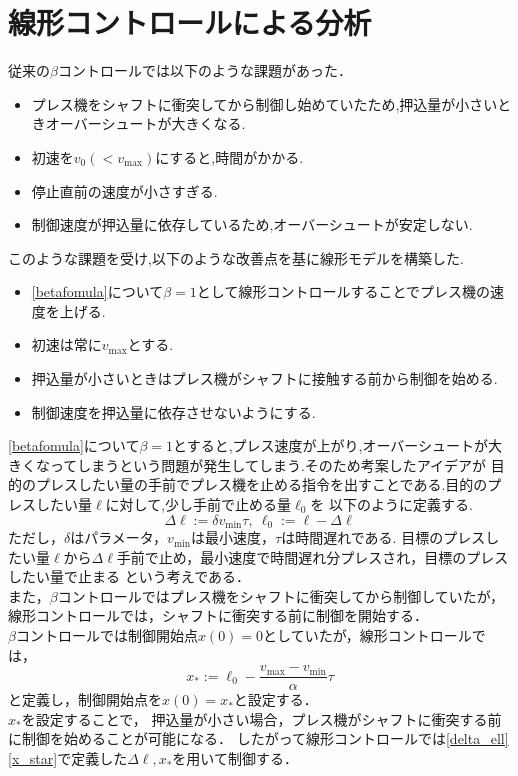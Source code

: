 \documentclass [dvipdfmx] {jsarticle}
\numberwithin{equation}{section}
\theoremstyle{definition} %
\theoremstyle{definition} %
\begin{document}
\section{線形コントロールによる分析}
従来の$\beta$コントロールでは以下のような課題があった．
\begin{itemize}
    \item プレス機をシャフトに衝突してから制御し始めていたため,押込量が小さいときオーバーシュートが大きくなる.
    \item 初速を$v_0(<v_{\max})$にすると,時間がかかる.
    \item 停止直前の速度が小さすぎる.
    \item 制御速度が押込量に依存しているため,オーバーシュートが安定しない.
\end{itemize}
このような課題を受け,以下のような改善点を基に線形モデルを構築した.
\begin{itemize}
    \item \eqref{betafomula}について$\beta=1$として線形コントロールすることでプレス機の速度を上げる. 
    \item 初速は常に$v_{\max}$とする.
    \item 押込量が小さいときはプレス機がシャフトに接触する前から制御を始める.
    \item 制御速度を押込量に依存させないようにする.
\end{itemize}
\eqref{betafomula}について$\beta=1$とすると,プレス速度が上がり,オーバーシュートが大きくなってしまうという問題が発生してしまう.そのため考案したアイデアが
目的のプレスしたい量の手前でプレス機を止める指令を出すことである.目的のプレスしたい量$\ell$に対して,少し手前で止める量$\ell_0$を
以下のように定義する.
\begin{equation}\label{delta_ell}
    \Delta\ell :=\delta v_{\min}\tau,\ \ell_0:=\ell-\Delta\ell
\end{equation}
ただし，$\delta$はパラメータ，$v_{\min}$は最小速度，$\tau$は時間遅れである.
目標のプレスしたい量$\ell$から$\Delta\ell$手前で止め，最小速度で時間遅れ分プレスされ，目標のプレスしたい量で止まる
という考えである．\\
また，$\beta$コントロールではプレス機をシャフトに衝突してから制御していたが，線形コントロールでは，シャフトに衝突する前に制御を開始する．\\
$\beta$コントロールでは制御開始点$x(0)=0$としていたが，線形コントロールでは，
\begin{equation}\label{x_star}
    x_\ast:=\ell_0-\displaystyle\frac{v_{\max}-v_{\min}}{\alpha}\tau
\end{equation}
と定義し，制御開始点を$x(0)=x_\ast$と設定する．\\
$x_\ast$を設定することで，
押込量が小さい場合，プレス機がシャフトに衝突する前に制御を始めることが可能になる．
したがって線形コントロールでは\eqref{delta_ell}\eqref{x_star}で定義した$\Delta\ell , x_\ast$を用いて制御する．
\end{document}
